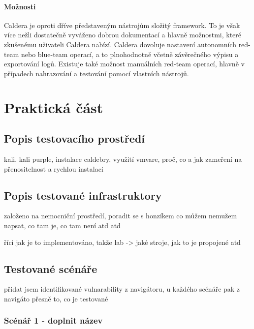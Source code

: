 \paragraph{Možnosti}
Caldera je oproti dříve představeným nástrojům složitý framework.
To je však více nežli dostatečně vyváženo dobrou dokumentací a hlavně možnostmi, které zkušenému uživateli Caldera nabízí.
Caldera dovoluje nastavení autonomních red-team nebo blue-team operací, a to plnohodnotně včetně závěrečného výpisu a exportování logů.
Existuje také možnost manuálních red-team operací, hlavně v případech nahrazování a testování pomocí vlastních nástrojů.\cite{mitre_caldera_docs}



\section{Praktická část}


\subsection{Popis testovacího prostředí}

kali, kali purple, instalace caldebry, využití vmvare, proč, co a jak
zameření na přenositelnost a rychlou instalaci

\subsection{Popis testované infrastruktory}

založeno na nemocniční prostředí, poradit se s honzíkem co můžem nemužem napsat, co tam je, co tam není atd atd

říci jak je to implementováno, takže lab -> jaké stroje, jak to je propojené atd

\subsection{Testované scénáře}

přidat jsem identifikované vulnarability z navigátoru, u každého scénáře pak z navigáto přesně to, co je testované

\subsubsection{Scénář 1 - doplnit název}

